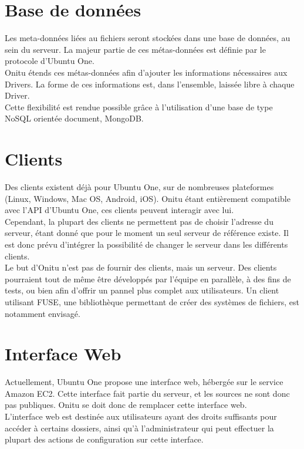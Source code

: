 \section{Base de données}
Les meta-données liées au fichiers seront stockées dans une base de données, au sein du serveur. La majeur partie de ces métas-données est définie par le protocole d'Ubuntu One.\\

Onitu étends ces métas-données afin d'ajouter les informations nécessaires aux Drivers. La forme de ces informations est, dans l'ensemble, laissée libre à chaque Driver.\\

Cette flexibilité est rendue possible grâce à l'utilisation d'une base de type NoSQL orientée document, MongoDB.

\section{Clients}
Des clients existent déjà pour Ubuntu One, sur de nombreuses plateformes (Linux, Windows, Mac OS, Android, iOS). Onitu étant entièrement compatible avec l'API d'Ubuntu One, ces clients peuvent interagir avec lui.\\

Cependant, la plupart des clients ne permettent pas de choisir l'adresse du serveur, étant donné que pour le moment un seul serveur de référence existe. Il est donc prévu d'intégrer la possibilité de changer le serveur dans les différents clients.\\

Le but d'Onitu n'est pas de fournir des clients, mais un serveur. Des clients pourraient tout de même être développés par l'équipe en parallèle, à des fins de tests, ou bien afin d'offrir un pannel plus complet aux utilisateurs. Un client utilisant FUSE, une bibliothèque permettant de créer des systèmes de fichiers, est notamment envisagé.\\

\section{Interface Web}
Actuellement, Ubuntu One propose une interface web, hébergée sur le service Amazon EC2. Cette interface fait partie du serveur, et les sources ne sont donc pas publiques.
Onitu se doit donc de remplacer cette interface web.\\

L'interface web est destinée aux utilisateurs ayant des droits suffisants pour accéder à certains dossiers, ainsi qu'à l'administrateur qui peut effectuer la plupart des actions de configuration sur cette interface.\\


